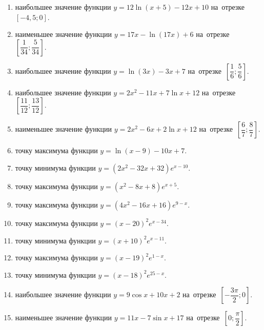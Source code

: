 \documentclass[a4paper,10pt]{article}
\begin{document}
\begin{enumerate}
\item {} наибольшее значение функции $y = 12\ln \left(x+5\right)-12x +10$ на~отрезке~$\left[-4,5;0\right]$.

\item {} наименьшее значение функции $y = 17x-\ln \left(17x\right)+6$ на~отрезке~$\left[\dfrac{1}{34};\dfrac{5}{34}\right]$.

\item {} наибольшее значение функции $y = \ln \left(3x\right)-3x+7$ на~отрезке~$\left[\dfrac{1}{6};\dfrac{5}{6}\right]$.

\item {} наибольшее значение функции $y=2x^2-11x+7\ln x+12$ на~отрезке~$\left[\dfrac{11}{12};\dfrac{13}{12}\right]$.

\item {} наименьшее значение функции $y=2x^2-6x+2\ln x+12$ на~отрезке~$\left[\dfrac{6}{7};\dfrac{8}{7}\right]$.

\item {} точку максимума функции $y=\ln \left(x-9\right)-10x+7$.

\item {} точку минимума функции $y=\left(2x^2-32x+32\right)e^{x-10}$.

\item {} точку максимума функции $y=\left(x^2-8x+8\right)e^{x+5}$.

\item {} точку максимума функции $y=\left(4x^2-16x+16\right)e^{9-x}$.

\item {} точку максимума функции $y=\left(x -20\right)^2e^{x-34}$.

\item {} точку минимума функции $y=\left(x +10\right)^2e^{x-11}$.

\item {} точку максимума функции $y=\left(x -19\right)^2e^{1-x}$.

\item {} точку минимума функции $y=\left(x -18\right)^2e^{25-x}$.

\item {} наибольшее значение функции $y=9\cos x+10x +2$ на~отрезке~$\left[-\dfrac{3\pi }{2};0\right]$.

\item {} наименьшее значение функции $y=11x-7\sin x +17$ на~отрезке~$\left[0;\dfrac{\pi }{2}\right]$.


\end{enumerate}
\end{document}
